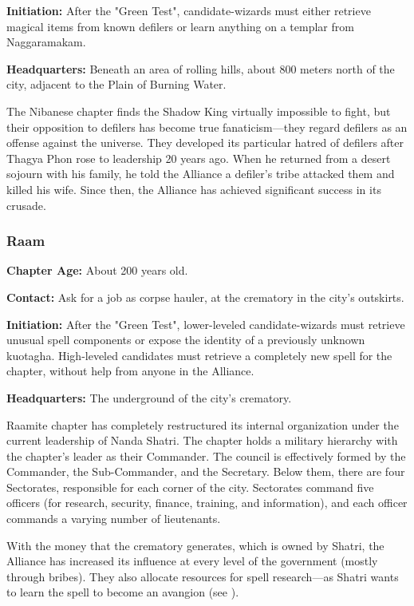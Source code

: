 \textbf{Initiation:} After the "Green Test", candidate-wizards must either retrieve magical items from known defilers or learn anything on a templar from Naggaramakam.

\textbf{Headquarters:} Beneath an area of rolling hills, about 800 meters north of the city, adjacent to the Plain of Burning Water.

The Nibanese chapter finds the Shadow King virtually impossible to fight, but their opposition to defilers has become true fanaticism---they regard defilers as an offense against the universe. They developed its particular hatred of defilers after Thagya Phon rose to leadership 20 years ago. When he returned from a desert sojourn with his family, he told the Alliance a defiler's tribe attacked them and killed his wife. Since then, the Alliance has achieved significant success in its crusade.


\subsubsection{Raam}
\textbf{Chapter Age:} About 200 years old.

\textbf{Contact:} Ask for a job as corpse hauler, at the crematory in the city's outskirts.

\textbf{Initiation:} After the "Green Test", lower-leveled candidate-wizards must retrieve unusual spell components or expose the identity of a previously unknown kuotagha. High-leveled candidates must retrieve a completely new spell for the chapter, without help from anyone in the Alliance.

\textbf{Headquarters:} The underground of the city's crematory.

Raamite chapter has completely restructured its internal organization under the current leadership of Nanda Shatri. The chapter holds a military hierarchy with the chapter's leader as their Commander. The council is effectively formed by the Commander, the Sub-Commander, and the Secretary. Below them, there are four Sectorates, responsible for each corner of the city. Sectorates command five officers (for research, security, finance, training, and information), and each officer commands a varying number of lieutenants.

With the money that the crematory generates, which is owned by Shatri, the Alliance has increased its influence at every level of the government (mostly through bribes). They also allocate resources for spell research---as Shatri wants to learn the spell to become an avangion (see ).


